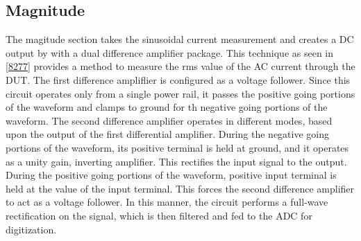 \subsection{Magnitude}

The magitude section takes the sinusoidal current measurement and creates a DC output by with a dual difference amplifier package. This technique as seen in \ref{8277} provides a method to measure the rms value of the AC current through the DUT. The first difference ampliflier is configured as a voltage follower. Since this circuit operates only from a single power rail, it passes the positive going portions of the waveform and clamps to ground for th negative going portions of the waveform. The second difference amplifier operates in different modes, based upon the output of the first differential amplifier. During the negative going portions of the waveform, its positive terminal is held at ground, and it operates as a unity gain, inverting amplifier. This rectifies the input signal to the output. During the positive going portions of the waveform, positive input terminal is held at the value of the input terminal. This forces the second difference amplifier to act as a voltage follower. In this manner, the circuit performs a full-wave rectification on the signal, which is then filtered and fed to the ADC for digitization.

